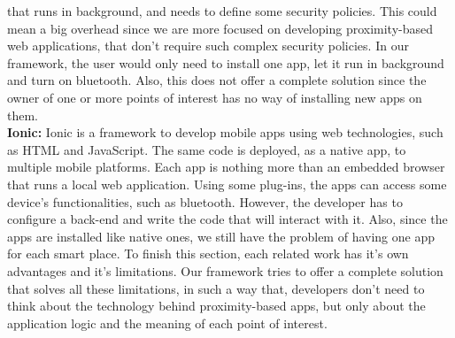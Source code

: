 that runs in background, and needs to define some
security policies. This could mean a big overhead since
we are more focused on developing proximity-based
web applications, that don't require such complex security
policies. In our framework, the user would only need to
install one app, let it run in background and turn on
bluetooth. Also, this does not offer a complete solution
since the owner of one or more points of interest
has no way of installing new apps on them. \\
\textbf{Ionic:} Ionic is a framework to develop mobile apps
using web technologies, such as HTML and JavaScript. The
same code is deployed, as a native app, to multiple mobile
platforms. Each app is nothing more than an embedded browser
that runs a local web application. 
Using some plug-ins, the apps can access some
device's functionalities, such as bluetooth. However,
the developer has to configure a back-end and write the
code that will interact with it. Also, since the apps are
installed like native ones, we still have the problem of
having one app for each smart place.
To finish this section, each related work has it's own
advantages and it's limitations. Our framework tries 
to offer a complete solution that solves all
these limitations, in such a way that, developers don't
need to think about the technology behind proximity-based
apps, but only about the application logic and the meaning
of each point of interest.
